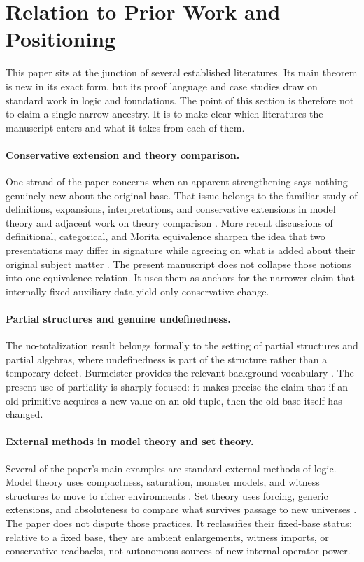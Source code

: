 \section{Relation to Prior Work and Positioning}\label{sec:prior-work}

This paper sits at the junction of several established literatures. Its main theorem is new in its exact form, but its proof language and case studies draw on standard work in logic and foundations. The point of this section is therefore not to claim a single narrow ancestry. It is to make clear which literatures the manuscript enters and what it takes from each of them.

\paragraph*{Conservative extension and theory comparison.}
One strand of the paper concerns when an apparent strengthening says nothing genuinely new about the original base. That issue belongs to the familiar study of definitions, expansions, interpretations, and conservative extensions in model theory and adjacent work on theory comparison \citep{ChangKeisler1990,Hodges1993}. More recent discussions of definitional, categorical, and Morita equivalence sharpen the idea that two presentations may differ in signature while agreeing on what is added about their original subject matter \citep{BarrettHalvorson2016}. The present manuscript does not collapse those notions into one equivalence relation. It uses them as anchors for the narrower claim that internally fixed auxiliary data yield only conservative change.

\paragraph*{Partial structures and genuine undefinedness.}
The no-totalization result belongs formally to the setting of partial structures and partial algebras, where undefinedness is part of the structure rather than a temporary defect. Burmeister provides the relevant background vocabulary \citep{Burmeister1986}. The present use of partiality is sharply focused: it makes precise the claim that if an old primitive acquires a new value on an old tuple, then the old base itself has changed.

\paragraph*{External methods in model theory and set theory.}
Several of the paper's main examples are standard external methods of logic. Model theory uses compactness, saturation, monster models, and witness structures to move to richer environments \citep{Hodges1993,Marker2002}. Set theory uses forcing, generic extensions, and absoluteness to compare what survives passage to new universes \citep{Jech2003,Kanamori2008}. The paper does not dispute those practices. It reclassifies their fixed-base status: relative to a fixed base, they are ambient enlargements, witness imports, or conservative readbacks, not autonomous sources of new internal operator power.

